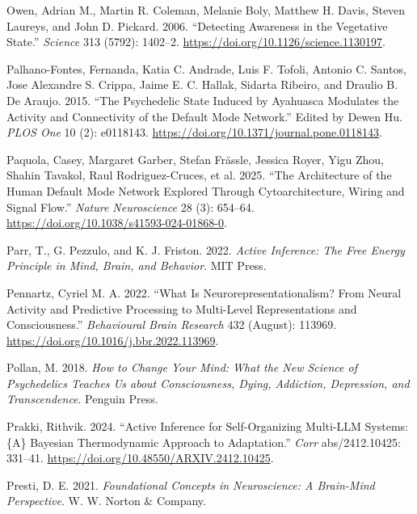 \documentclass[
  a4paper]{article}
\newlength{\cslhangindent}
\newenvironment{CSLReferences}[2] %
 {\begin{list}{}{%
  \setlength{\itemindent}{0pt}
  \setlength{\leftmargin}{0pt}
  \setlength{\parsep}{0pt}
  \ifodd #1
   \setlength{\leftmargin}{\cslhangindent}
   \setlength{\itemindent}{-1\cslhangindent}
  \fi
  \setlength{\itemsep}{#2\baselineskip}}}
 {\end{list}}
\begin{document}
\begin{CSLReferences}{1}{0}
Owen, Adrian M., Martin R. Coleman, Melanie Boly, Matthew H. Davis,
Steven Laureys, and John D. Pickard. 2006. {``Detecting Awareness in the
Vegetative State.''} \emph{Science} 313 (5792): 1402--2.
\url{https://doi.org/10.1126/science.1130197}.

Palhano-Fontes, Fernanda, Katia C. Andrade, Luis F. Tofoli, Antonio C.
Santos, Jose Alexandre S. Crippa, Jaime E. C. Hallak, Sidarta Ribeiro,
and Draulio B. De Araujo. 2015. {``The Psychedelic State Induced by
Ayahuasca Modulates the Activity and Connectivity of the Default Mode
Network.''} Edited by Dewen Hu. \emph{PLOS One} 10 (2): e0118143.
\url{https://doi.org/10.1371/journal.pone.0118143}.

Paquola, Casey, Margaret Garber, Stefan Frässle, Jessica Royer, Yigu
Zhou, Shahin Tavakol, Raul Rodriguez-Cruces, et al. 2025. {``The
Architecture of the Human Default Mode Network Explored Through
Cytoarchitecture, Wiring and Signal Flow.''} \emph{Nature Neuroscience}
28 (3): 654--64. \url{https://doi.org/10.1038/s41593-024-01868-0}.

Parr, T., G. Pezzulo, and K. J. Friston. 2022. \emph{Active Inference:
The Free Energy Principle in Mind, Brain, and Behavior}. MIT Press.

Pennartz, Cyriel M. A. 2022. {``What Is Neurorepresentationalism? {From}
Neural Activity and Predictive Processing to Multi-Level Representations
and Consciousness.''} \emph{Behavioural Brain Research} 432 (August):
113969. \url{https://doi.org/10.1016/j.bbr.2022.113969}.

Pollan, M. 2018. \emph{How to Change Your Mind: What the New Science of
Psychedelics Teaches Us about Consciousness, Dying, Addiction,
Depression, and Transcendence}. Penguin Press.

Prakki, Rithvik. 2024. {``Active Inference for Self-Organizing
Multi-{LLM} Systems: \{A\} Bayesian Thermodynamic Approach to
Adaptation.''} \emph{Corr} abs/2412.10425: 331--41.
\url{https://doi.org/10.48550/ARXIV.2412.10425}.

Presti, D. E. 2021. \emph{Foundational Concepts in Neuroscience: A
Brain-Mind Perspective}. W. W. Norton \& Company.


\end{CSLReferences}
\end{document}

